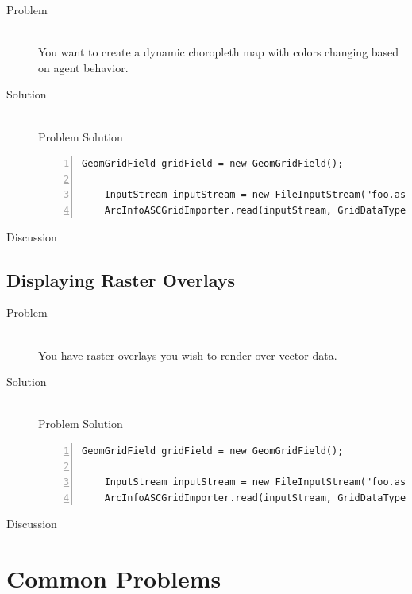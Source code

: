 \documentclass[twoside,10pt]{book}
\begin{document}
\begin{description}
\item[Problem]~\\
You want to create a dynamic choropleth map with colors changing based
on agent behavior.

\item[Solution]~\\
Problem Solution
\begin{Verbatim}[frame=lines,framesep=5mm,numbers=left,commandchars=+\[\]]
	GeomGridField gridField = new GeomGridField();
	
	InputStream inputStream = new FileInputStream("foo.asc");
	ArcInfoASCGridImporter.read(inputStream, GridDataType.INTEGER, gridField);
\end{Verbatim}

\item[Discussion ]
\end{description}



\section{Displaying Raster Overlays}
\label{sec:displayingrasteroverlays}

\begin{description}
\item[Problem]~\\
You have raster overlays you wish to render over vector data.

\item[Solution]~\\
Problem Solution
\begin{Verbatim}[frame=lines,framesep=5mm,numbers=left,commandchars=+\[\]]
	GeomGridField gridField = new GeomGridField();
	
	InputStream inputStream = new FileInputStream("foo.asc");
	ArcInfoASCGridImporter.read(inputStream, GridDataType.INTEGER, gridField);
\end{Verbatim}

\item[Discussion ]
\end{description}







\chapter{Common Problems}
\label{ch:commonprobs}
\end{document}
